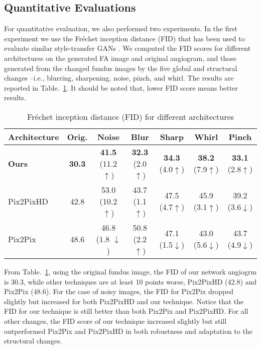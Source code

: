 \documentclass[runningheads]{llncs}
\begin{document}
\subsection{Quantitative Evaluations}
\label{subsec:qual}

For quantitative evaluation, we also performed two experiments. In the first experiment we use the Fréchet inception distance (FID) \cite{heusel2017gans} that has been used to evaluate similar style-transfer GANs \cite{karras2019style}. We computed the FID scores for different architectures on the generated FA image and original angiogram, and those generated from the changed fundus images by the five global and structural changes --i.e., blurring, sharpening, noise, pinch, and whirl. The results are reported in Table.~\ref{table2}. It should be noted that, lower FID score means better results. 

\begin{table}[htb]
\caption{Fréchet inception distance (FID) for different architectures}
    \label{table2}
\centering
\begin{tabular}{l|c|c|c|c|c|c} 
\hline
\small Architecture & \small Orig. & \small Noise & \small Blur & \small Sharp & \small Whirl & \small Pinch \\
\hline
\small \textbf{Ours} & \small\textbf{ 30.3} & \small \textbf{41.5 }(11.2$\uparrow$) & \small \textbf{32.3} (2.0$\uparrow$) & \small \textbf{34.3} (4.0$\uparrow$) & \small \textbf{38.2} (7.9$\uparrow$) & \small \textbf{33.1} (2.8$\uparrow$) \\ 

\small Pix2PixHD \cite{wang2018high} & \small 42.8  &  \small 53.0 (10.2$\uparrow$)& \small 43.7 (1.1$\uparrow$) & \small 47.5 (4.7$\uparrow$) & \small 45.9 (3.1$\uparrow$) & \small 39.2 (3.6$\downarrow$) \\ 
\small Pix2Pix \cite{isola2017image} & \small 48.6  &  \small 46.8 (1.8 $\downarrow$)& \small 50.8 (2.2$\uparrow$)& \small 47.1 (1.5$\downarrow$) & \small 43.0 (5.6$\downarrow$)& \small 43.7 (4.9$\downarrow$) \\ 
\hline
\end{tabular}
\end{table}

From Table.~\ref{table2}, using the original fundus image, the FID of our network angiogrm is 30.3, while other techniques are at least 10 points worse, Pix2PixHD (42.8) and Pix2Pix (48.6). For the case of noisy images, the FID for Pix2Pix dropped slightly but increased for both Pix2PixHD and our technique. Notice that the FID for our technique is still better than both Pix2Pix and Pix2PixHD. For all other changes, the FID score of our technique increased slightly but still outperformed Pix2Pix and Pix2PixHD in both robustness and adaptation to the structural changes.
\end{document}
